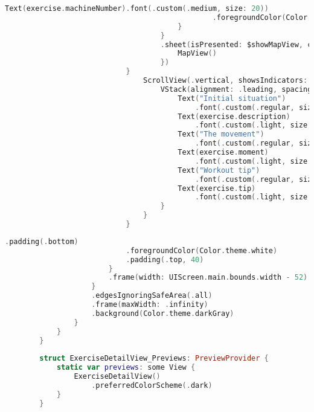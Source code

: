 \begin{minipage}{\textwidth}
\begin{lstlisting}[language=swift]
                                            Text(exercise.machineNumber).font(.custom(.medium, size: 20))
                                                .foregroundColor(Color.theme.white)
                                        }
                                    }
                                    .sheet(isPresented: $showMapView, content: {
                                        MapView()
                                    })
                            }
                                ScrollView(.vertical, showsIndicators: false){
                                    VStack(alignment: .leading, spacing: 10){
                                        Text("Initial situation")
                                            .font(.custom(.regular, size: 18))
                                        Text(exercise.description)
                                            .font(.custom(.light, size: 14))
                                        Text("The movement")
                                            .font(.custom(.regular, size: 18))
                                        Text(exercise.moment)
                                            .font(.custom(.light, size: 14))
                                        Text("Workout tip")
                                            .font(.custom(.regular, size: 18))
                                        Text(exercise.tip)
                                            .font(.custom(.light, size: 14))
                                    }
                                }
                            }
    \end{lstlisting}   
\end{minipage}

\hspace{-10mm}
\begin{minipage}{\textwidth}
    \linespread{0.8}\selectfont
    \begin{lstlisting}[language=swift]
        .padding(.bottom)
                            .foregroundColor(Color.theme.white)
                            .padding(.top, 40)
                        }
                        .frame(width: UIScreen.main.bounds.width - 52)
                    }
                    .edgesIgnoringSafeArea(.all)
                    .frame(maxWidth: .infinity)
                    .background(Color.theme.darkGray)
                }
            }
        }
                
        struct ExerciseDetailView_Previews: PreviewProvider {
            static var previews: some View {
                ExerciseDetailView()
                    .preferredColorScheme(.dark)
            }
        }
    \end{lstlisting}   
\end{minipage}

